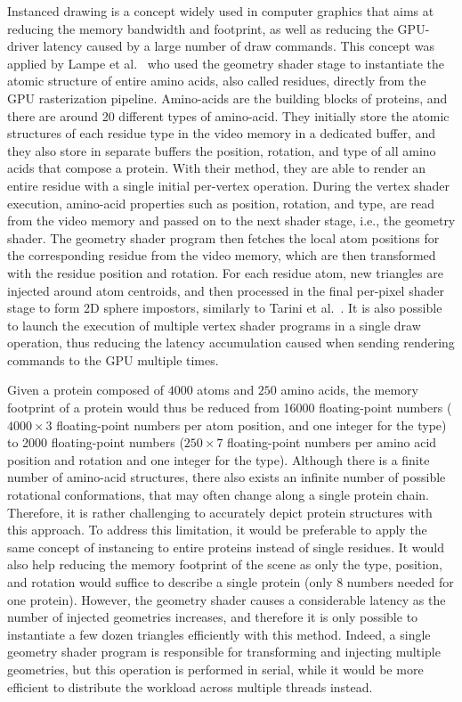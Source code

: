Instanced drawing is a concept widely used in computer graphics that aims at reducing the memory bandwidth and footprint, as well as reducing the GPU-driver latency caused by a large number of draw commands.
This concept was applied by Lampe et al.~\cite{lampe2007two} who used the geometry shader stage to instantiate the atomic structure of entire amino acids, also called residues, directly from the GPU rasterization pipeline.
Amino-acids are the building blocks of proteins, and there are around 20 different types of amino-acid.
They initially store the atomic structures of each residue type in the video memory in a dedicated buffer, and they also store in separate buffers the position, rotation, and type of all amino acids that compose a protein.
With their method, they are able to render an entire residue with a single initial per-vertex operation.
During the vertex shader execution, amino-acid properties such as position, rotation, and type, are read from the video memory and passed on to the next shader stage, i.e., the geometry shader.
The geometry shader program then fetches the local atom positions for the corresponding residue from the video memory, which are then transformed with the residue position and rotation.
For each residue atom, new triangles are injected around atom centroids, and then processed in the final per-pixel shader stage to form 2D sphere impostors, similarly to Tarini et al.~\cite{tarini2006ambient}.
It is also possible to launch the execution of multiple vertex shader programs in a single draw operation, thus reducing the latency accumulation caused when sending rendering commands to the GPU multiple times.

Given a protein composed of $4000$ atoms and $250$ amino acids, the memory footprint of a protein would thus be reduced from 16000 floating-point numbers ($4000 \times 3$ floating-point numbers per atom position, and one integer for the type) to 2000 floating-point numbers ($250 \times 7$ floating-point numbers per amino acid position and rotation and one integer for the type).
Although there is a finite number of amino-acid structures, there also exists an infinite number of possible rotational conformations, that may often change along a single protein chain.
Therefore, it is rather challenging to accurately depict protein structures with this approach.
To address this limitation, it would be preferable to apply the same concept of instancing to entire proteins instead of single residues.
It would also help reducing the memory footprint of the scene as only the type, position, and rotation would suffice to describe a single protein (only 8 numbers needed for one protein).
However, the geometry shader causes a considerable latency as the number of injected geometries increases, and therefore it is only possible to instantiate a few dozen triangles efficiently with this method.
Indeed, a single geometry shader program is responsible for transforming and injecting multiple geometries, but this operation is performed in serial, while it would be more efficient to distribute the workload across multiple threads instead.

